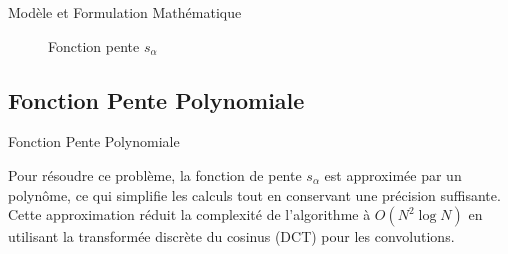 \documentclass[8pt,a4paper]{beamer}
\numberwithin{figure}{section}
\begin{document}
\begin{frame}{Modèle et Formulation Mathématique}
\begin{figure}[h]
\begin{center}
\end{center}
\label{figure4.1}
\caption{Fonction pente $s_\alpha$}
\end{figure} 
\end{frame}

\subsection{Fonction Pente Polynomiale}
\begin{frame}{Fonction Pente Polynomiale}
\par Pour résoudre ce problème, la fonction de pente \( s_\alpha \) est approximée par un polynôme, ce qui simplifie les calculs tout en conservant une précision suffisante. Cette approximation réduit la complexité de l'algorithme à \( O(N^2 \log N) \) en utilisant la transformée discrète du cosinus (DCT) pour les convolutions.
\end{frame}
\end{document}
